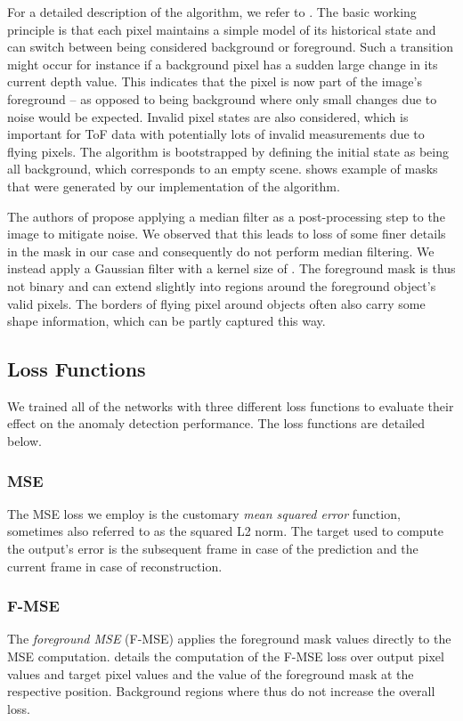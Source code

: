 \documentclass[10pt,twocolumn,letterpaper]{article}
\begin{document}
For a detailed description of the algorithm, we refer to \cite{physically_based_BGS}. The basic working principle is that each pixel maintains a simple model of its historical state and can switch between being considered background or foreground. Such a transition might occur for instance if a background pixel has a sudden large change in its current depth value. This indicates that the pixel is now part of the image's foreground -- as opposed to being background where only small changes due to noise would be expected. Invalid pixel states are also considered, which is important for ToF data with potentially lots of invalid measurements due to \eg flying pixels. The algorithm is bootstrapped by defining the initial state as being all background, which corresponds to an empty scene.  shows example of masks that were generated by our implementation of the algorithm.

The authors of \cite{physically_based_BGS} propose applying a median filter as a post-processing step to the image to mitigate noise. We observed that this leads to loss of some finer details in the mask in our case and consequently do not perform median filtering. We instead apply a Gaussian filter with a kernel size of . The foreground mask is thus not binary and can extend slightly into regions around the foreground object's valid pixels. The borders of flying pixel around objects often also carry some shape information, which can be partly captured this way.

\subsection{Loss Functions} \label{sec:loss_fns}
We trained all of the networks with three different loss functions to evaluate their effect on the anomaly detection performance. The loss functions are detailed below.

\subsubsection{MSE}
The MSE loss we employ is the customary \emph{mean squared error} function, sometimes also referred to as the squared L2 norm. The target used to compute the output's error is the subsequent frame in case of the prediction and the current frame in case of reconstruction.

\subsubsection{F-MSE}
The \emph{foreground MSE} (F-MSE) applies the foreground mask values directly to the MSE computation.  details the computation of the F-MSE loss over  output pixel values  and target pixel values  and the value of the foreground mask  at the respective position. Background regions where  thus do not increase the overall loss.
\end{document}
